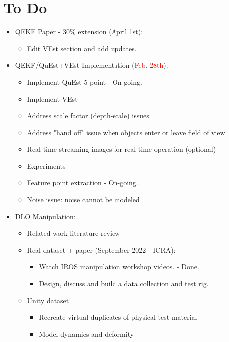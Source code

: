 \documentclass[11pt]{article}
\begin{document}
\section{To Do}
\begin{itemize}
  \item QEKF Paper - 30\% extension (April 1st):
  \begin{itemize}
      \item Edit VEst section and add updates.
  \end{itemize}
  \item QEKF/QuEst+VEst Implementation (\textcolor{red}{Feb. 28th}):
  \begin{itemize}
      \item Implement QuEst 5-point - On-going.
      \item Implement VEst
      \item Address scale factor (depth-scale) issues
      \item Address "hand off" issue when objects enter or leave field of view
      \item Real-time streaming images for real-time operation (optional)
      \item Experiments
      \item Feature point extraction - On-going.
      \item Noise issue: noise cannot be modeled
  \end{itemize}
  \item  DLO Manipulation:
  \begin{itemize}
      \item Related work literature review
      \item Real dataset + paper (September 2022 - ICRA):
      \begin{itemize}
            \item Watch IROS manipulation workshop videos. - Done.
            \item Design, discuss and build a data collection and test rig.
      \end{itemize}
      \item Unity dataset
      \begin{itemize}
            \item Recreate virtual duplicates of physical test material
            \item Model dynamics and deformity
      \end{itemize}
  \end{itemize}
\end{itemize}
\end{document}
